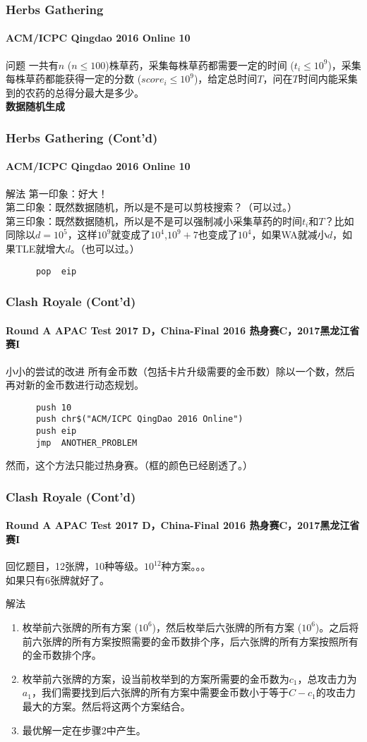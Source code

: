 \documentclass[hyperref={unicode=true}]{beamer}
\begin{document}
\begin{frame}\frametitle{Herbs Gathering}
  \framesubtitle{ACM/ICPC Qingdao 2016 Online 10}
  \begin{block}{问题}
    一共有$n$ ($n\leq100$)株草药，采集每株草药都需要一定的时间 ($t_i\leq10^9$)，采集每株草药都能获得一定的分数 ($score_i\leq10^9$)，给定总时间$T$，问在$T$时间内能采集到的农药的总得分最大是多少。\\
    {\bf 数据随机生成}
  \end{block}
\end{frame}
\begin{frame}[fragile]\frametitle{Herbs Gathering (Cont'd)}
  \framesubtitle{ACM/ICPC Qingdao 2016 Online 10}
  \begin{exampleblock}{解法}
    第一印象：好大！\\
    第二印象：既然数据随机，所以是不是可以剪枝搜索？（可以过。）\\
    第三印象：既然数据随机，所以是不是可以强制减小采集草药的时间$t_i$和$T$？比如同除以$d=10^5$，这样$10^9$就变成了$10^4$,$10^9+7$也变成了$10^4$，如果WA就减小$d$，如果TLE就增大$d$。（也可以过。）
    \begin{verbatim}
      pop  eip
    \end{verbatim}
  \end{exampleblock}
\end{frame}
\begin{frame}[fragile]\frametitle{Clash Royale (Cont'd)}
  \framesubtitle{Round A APAC Test 2017 D，China-Final 2016 热身赛C，2017黑龙江省赛I}
  \begin{alertblock}{小小的尝试的改进}
    所有金币数（包括卡片升级需要的金币数）除以一个数，然后再对新的金币数进行动态规划。\\
    \begin{verbatim}
      push 10
      push chr$("ACM/ICPC QingDao 2016 Online")
      push eip
      jmp  ANOTHER_PROBLEM
    \end{verbatim}
    然而，这个方法只能过热身赛。（框的颜色已经剧透了。）
  \end{alertblock}
\end{frame}
\begin{frame}[fragile]\frametitle{Clash Royale (Cont'd)}
  \framesubtitle{Round A APAC Test 2017 D，China-Final 2016 热身赛C，2017黑龙江省赛I}
  回忆题目，12张牌，10种等级。$10^{12}$种方案。。。\\
  如果只有6张牌就好了。
  \pause\begin{exampleblock}{解法}
  \begin{enumerate}[1.]
  \item 枚举前六张牌的所有方案 ($10^6$)，然后枚举后六张牌的所有方案 ($10^6$)。之后将前六张牌的所有方案按照需要的金币数排个序，后六张牌的所有方案按照所有的金币数排个序。\\
  \item 枚举前六张牌的方案，设当前枚举到的方案所需要的金币数为$c_1$，总攻击力为$a_1$，我们需要找到后六张牌的所有方案中需要金币数小于等于$C-c_1$的攻击力最大的方案。然后将这两个方案结合。
  \item 最优解一定在步骤2中产生。
  \end{enumerate}
  \end{exampleblock}
\end{frame}
\end{document}
